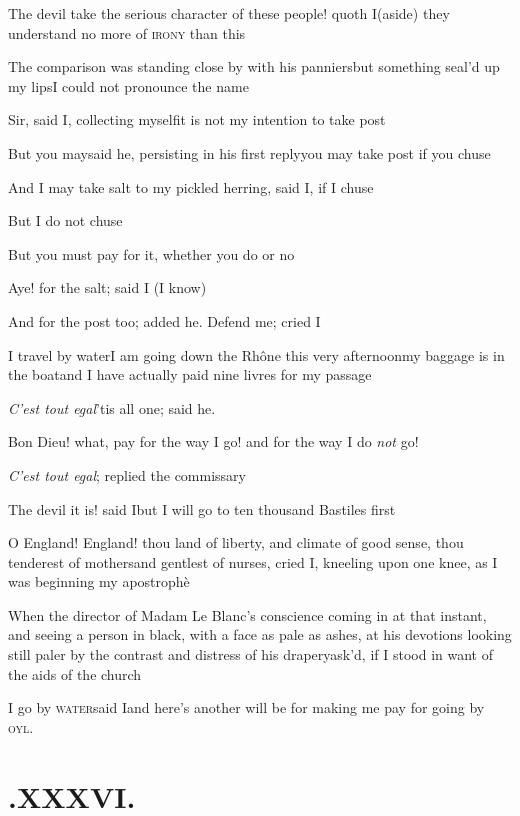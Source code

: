 \documentclass{article}
\begin{document}
\tsh The devil take the serious character of these
people! quoth I\tsk (aside) they understand no more of \textsc{irony} than
this\tsh

The comparison was standing close by with his panniers\tsk but
something seal’d up my lips\tsk I could not pronounce the
name\tsh

Sir, said I, collecting myself\tsk it is not my intention to
take post\tsh

\tsk But you may\tsk said he, persisting in his first
reply\tsk you may take post if you chuse\tsh

\tsk And I may take salt to my pickled herring, said I, if I
chuse\tsh

\tsk But I do not chuse\tsk

\tsk But you must pay for it, whether you do or no\tsh

Aye! for the salt; said I (I know)\tsh{}

\tsk And for the post too; added he. Defend me; cried
I\tsh

I travel by water\tsk I am going down the Rhône this very afternoon\tsk my baggage is in
the boat\tsk and I have actually paid nine livres for my passage\tsh

\textit{C’est tout egal}\tsk ’tis all one; said
he.

Bon Dieu! what, pay for the way I go! and for the way I
do \textit{not} go!

\tsh \textit{C’est tout egal}; replied the
commissary\tsh

\tsh The devil it is! said I\tsk but I will go to ten
thousand Bastiles first\tsh

O England! England! thou land of liberty, and
climate of good sense, thou tenderest of mothers\tsk and gentlest
of nurses, cried I, kneeling upon one knee, as I was beginning my
apostrophè\tsh{}

When the director of Madam Le Blanc’s conscience
coming in at that instant, and seeing a person in black, with a
face as pale as ashes, at his devotions\break
\tsk looking still paler by the contrast and distress of his
drapery\tsk ask’d, if I stood in want of the aids of the
church\tsh

I go by \textsc{water}\tsk said I\tsk and here’s
another will be for making me pay for going by
\textsc{oyl}.

\section{.\enspace XXXVI.}
\end{document}

